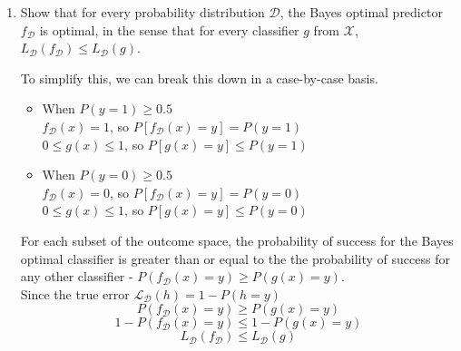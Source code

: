 \documentclass[12pt]{article}
\begin{document}
\begin{enumerate}
    \item Show that for every probability distribution $\mathcal{D}$, the Bayes optimal predictor $f_\mathcal{D}$ is optimal, in the sense that for every classifier $g$ from $\mathcal{X}$, $L_\mathcal{D}(f_\mathcal{D})\leq L_\mathcal{D}(g)$.

    To simplify this, we can break this down in a case-by-case basis.
    \begin{itemize}
        \item When $P(y=1)\geq 0.5$\\
        $f_\mathcal{D}(x)=1$, so $P[f_\mathcal{D}(x)=y]=P(y=1)$\\
        $0\leq g(x)\leq 1$, so $P[g(x)=y]\leq P(y=1)$
        \item When $P(y=0)\geq 0.5$\\
        $f_\mathcal{D}(x)=0$, so $P[f_\mathcal{D}(x)=y]=P(y=0)$\\
        $0\leq g(x)\leq 1$, so $P[g(x)=y]\leq P(y=0)$
    \end{itemize}
    For each subset of the outcome space, the probability of success for the Bayes optimal classifier is greater than or equal to the the probability of success for any other classifier - $P(f_\mathcal{D}(x)=y)\geq P(g(x)=y)$.\\
    Since the true error $\mathcal{L}_\mathcal{D}(h)=1-P(h=y)$
    $$P(f_\mathcal{D}(x)=y)\geq P(g(x)=y)$$
    $$1-P(f_\mathcal{D}(x)=y)\leq 1-P(g(x)=y)$$
    $$L_\mathcal{D}(f_\mathcal{D})\leq L_\mathcal{D}(g)$$
\end{enumerate}
\end{document}

